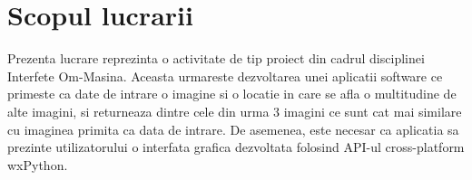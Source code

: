 \section{Scopul lucrarii}


\quad Prezenta lucrare reprezinta o activitate de tip proiect din cadrul disciplinei 
Interfete Om-Masina. Aceasta urmareste dezvoltarea unei aplicatii software ce primeste ca 
date de intrare o imagine si o locatie in care se afla o multitudine de alte imagini, si 
returneaza dintre cele din urma 3 imagini ce sunt cat mai similare cu imaginea primita ca data
de intrare. De asemenea, este necesar ca aplicatia sa prezinte utilizatorului o interfata
grafica dezvoltata folosind API-ul cross-platform wxPython.


